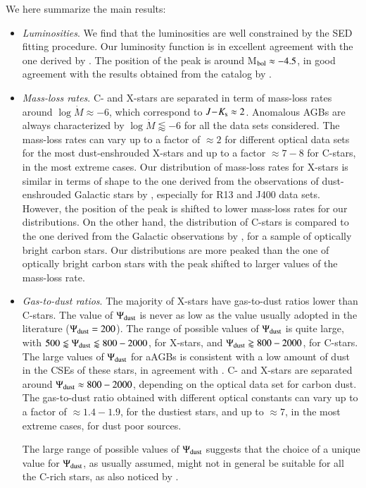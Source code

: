 \documentclass[useAMS,usenatbib]{mn2e/mn2e}
\newcommand{\jks}{\mbox{$J\!-\!K_{\rm s}$}}
\begin{document}
{We here summarize the main results:
\begin{itemize}
\item \textit{Luminosities}. We find that the luminosities are well constrained by the SED fitting procedure. Our luminosity function is in excellent agreement with the one derived by \citet{Srinivasan16}. The position of the peak is around M$_{\rm bol}\approx-4.5$, in good agreement with the results obtained from the catalog by \citet{Rebeirot_etal93}.
\item \textit{Mass-loss rates}. C- and X-stars are separated in term of mass-loss rates around  $\log\dot{M}\approx-6$, which correspond to $\jks\approx 2$. 
Anomalous AGBs are always characterized by $\log\dot{M}\lessapprox -6$  for all the data sets considered.
The mass-loss rates can vary up to a factor of $\approx2$ for different optical data sets for the most dust-enshrouded X-stars and up to a factor $\approx7-8$ for C-stars, in the most extreme cases.
Our distribution of mass-loss rates for X-stars is similar in terms of shape to the one derived from the observations of dust-enshrouded Galactic stars by \citet{Groenewegen02}, especially for R13 and J400 data sets. However, the position of the peak is shifted to lower mass-loss rates for our distributions.
On the other hand, the distribution of C-stars is compared to the one derived from the Galactic observations by \citet{Schoier01}, for a sample of optically bright carbon stars. Our distributions are more peaked than the one of optically bright carbon stars with the peak shifted to larger values of the mass-loss rate.
\item \textit{Gas-to-dust ratios}. The majority of X-stars have gas-to-dust ratios lower than C-stars. The value of $\Psi_{\rm dust}$ is never as low as the value usually adopted in the literature ($\Psi_{\rm dust}= 200$). The range of possible values of $\Psi_{\rm dust}$ is quite large, with $500\lessapprox\Psi_{\rm dust}\lessapprox800-2000$, for X-stars, and $\Psi_{\rm dust}\gtrapprox800-2000$, for C-stars. The large values of $\Psi_{\rm dust}$ for aAGBs is consistent with a low amount of dust in the CSEs of these stars, in agreement with \citet{Boyer11}. C- and X-stars are separated around $\Psi_{\rm dust}\approx 800-2000$, depending on the optical data set for carbon dust. 
The gas-to-dust ratio obtained with different optical constants can vary up to a factor of $\approx1.4-1.9$, for the dustiest stars, and up to $\approx7$, in the most extreme cases, for dust poor sources.

The large range of possible values of $\Psi_{\rm dust}$ suggests that the choice of a unique value for $\Psi_{\rm dust}$, as usually assumed, might not in general be suitable for all the C-rich stars, as also noticed by \citet{Eriksson14}. 


\end{itemize}}
\end{document}
